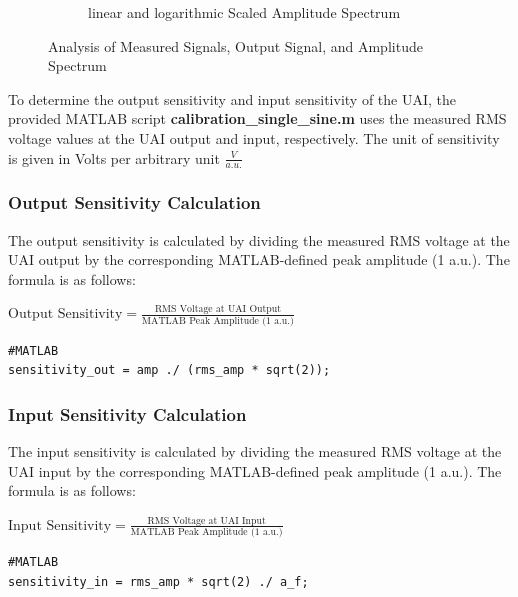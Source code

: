 \documentclass[
	a4paper,
	11pt,
]{article}
\begin{document}
\begin{figure}[htb!]
\begin{subfigure}[b]{0.45\textwidth}
        \caption[ linear and logarithmic Scaled Amplitude Spectrum]%
        {{\small linear and logarithmic Scaled Amplitude Spectrum}}    
        \label{fig:mean and std of net14}
    \end{subfigure}
    \caption[ figure of all settings ]
        {\small Analysis of Measured Signals, Output Signal, and Amplitude Spectrum} 
        \label{fig:mean and std of nets}
       
\end{figure} 
\indent

To determine the output sensitivity and input sensitivity of the UAI, the provided MATLAB script \textbf{calibration\_single\_sine.m} uses the measured RMS voltage values at the UAI output and input, respectively. The unit of sensitivity is given in Volts per arbitrary unit \( \frac{V}{a.u.} \)

\subsubsection{Output Sensitivity Calculation}
The output sensitivity is calculated by dividing the measured RMS voltage at the UAI output by the corresponding MATLAB-defined peak amplitude (1 a.u.). The formula is as follows:

\begin{center}
\( \text{Output Sensitivity} = \frac{\text{RMS Voltage at UAI Output}}{\text{MATLAB Peak Amplitude (1 a.u.)}}\)
\end{center}

\begin{verbatim}
#MATLAB
sensitivity_out = amp ./ (rms_amp * sqrt(2));
\end{verbatim}

\subsubsection{Input Sensitivity Calculation}
The input sensitivity is calculated by dividing the measured RMS voltage at the UAI input by the corresponding MATLAB-defined peak amplitude (1 a.u.). The formula is as follows:

\begin{center}
\( \text{Input Sensitivity} = \frac{\text{RMS Voltage at UAI Input}}{\text{MATLAB Peak Amplitude (1 a.u.)}} \)
\end{center} 

\begin{verbatim}
#MATLAB
sensitivity_in = rms_amp * sqrt(2) ./ a_f;
\end{verbatim}
\end{document}
